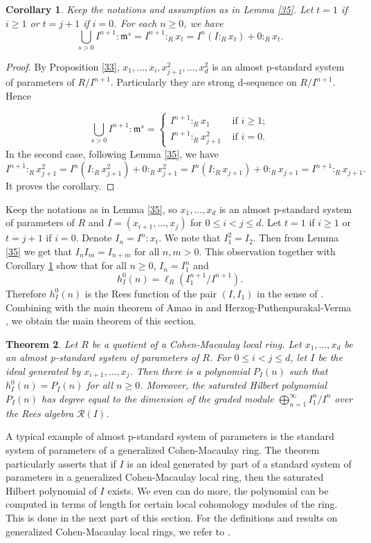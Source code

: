 \documentclass{amsart}
\newtheorem{theorem}{Theorem}[section]
\newtheorem {corollary}[theorem]{Corollary}
\theoremstyle {definition}
\theoremstyle {remark}
\begin{document}
\begin{corollary}\label{36}
Keep the notations and assumption as in Lemma \ref{35}. Let $t=1$ if $i\geq 1$ or $t=j+1$ if $i=0$. For each $n\geq 0$, we have
$$\bigcup_{s>0}I^{n+1}:{\ensuremath{\mathfrak m}}^s=I^{n+1}:_Rx_t=I^n(I:_Rx_t)+0:_Rx_t.$$
\end{corollary}
\begin{proof}
By Proposition \ref{33}, $x_1, \ldots, x_i, x_{j+1}^2, \ldots, x_d^2$ is an almost p-standard system of parameters of $R/I^{n+1}$. Particularly they are strong d-sequence on $R/I^{n+1}$. Hence

$$
\bigcup_{s>0}I^{n+1}:{\ensuremath{\mathfrak m}}^s=
\begin{cases}
I^{n+1}:_Rx_1&\mbox{ if } i\geq 1;\\
I^{n+1}:_Rx_{j+1}^2&\mbox{ if } i=0.
\end{cases}
$$
In the second case, following Lemma \ref{35}, we have
$$I^{n+1}:_Rx_{j+1}^2=I^n(I:_Rx_{j+1}^2)+0:_Rx_{j+1}^2=I^n(I:_Rx_{j+1})+0:_Rx_{j+1}=I^{n+1}:_Rx_{j+1}.$$
It proves the corollary.
\end{proof}

Keep the notations as in Lemma \ref{35}, so $x_1, \ldots, x_d$ is an almost p-standard system of parameters of $R$ and $I=(x_{i+1}, \ldots, x_j)$ for $0\leq i<j\leq d$.  Let $t=1$ if $i\geq 1$ or $t=j+1$ if $i=0$. Denote $I_n=I^n:x_t$. We note that $I_1^2=I_2$. Then from Lemma \ref{35} we get that $I_nI_m=I_{n+m}$ for all $n, m>0$. This observation together with Corollary \ref{36} show that for all $n\geq 0$, $I_n=I_1^n$ and
$$h^0_I(n)=\ell_R(I_1^{n+1}/I^{n+1}).$$
Therefore $h^0_I(n)$ is the Rees function of the pair $(I, I_1)$ in the sense of \cite{HPV}. Combining with the main theorem of Amao in \cite{AMAO} and Herzog-Puthenpurakal-Verma \cite[Corollary 4.7]{HPV}, we obtain the main theorem of this section.

\begin{theorem}\label{37}
Let $R$ be a quotient of a Cohen-Macaulay local ring. Let $x_1, \ldots, x_d$ be an almost p-standard system of parameters of $R$. For $0\leq i<j\leq d$, let $I$ be the ideal generated by $x_{i+1}, \ldots, x_j$. Then there is a polynomial $P_I(n)$ such that $h^0_I(n)=P_I(n)$ for all $n\geq 0$. Moreover, the saturated Hilbert polynomial $P_I(n)$ has degree equal to the dimension of the graded module $\bigoplus_{n=1}^\infty I_1^n/I^n$ over the Rees algebra $\mathcal R(I)$.
\end{theorem}

A typical example of almost p-standard system of parameters is the standard system of parameters of a generalized Cohen-Macaulay ring. The theorem particularly asserts that if $I$ is an ideal generated by part of a standard system of parameters in a generalized Cohen-Macaulay local ring, then the saturated Hilbert polynomial of $I$ exists. We even can do more, the polynomial can be computed in terms of length for certain local cohomology modules of the ring. This is done in the next part of this section. For the definitions and results on generalized Cohen-Macaulay local rings, we refer to \cite{NVT2}.
\end{document}
